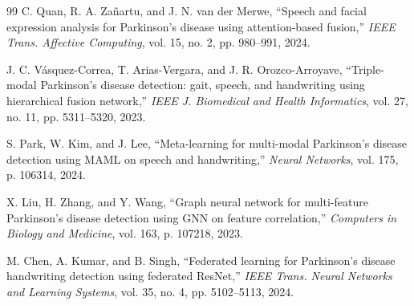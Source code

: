 \documentclass[10pt,conference,letterpaper]{IEEEtran}
\begin{document}
\begin{thebibliography}{99}
 C. Quan, R. A. Za\~{n}artu, and J. N. van der Merwe, ``Speech and facial expression analysis for {P}arkinson's disease using attention-based fusion,'' \textit{IEEE Trans. Affective Computing}, vol. 15, no. 2, pp. 980--991, 2024.

 J. C. V\'{a}squez-Correa, T. Arias-Vergara, and J. R. Orozco-Arroyave, ``Triple-modal {P}arkinson's disease detection: gait, speech, and handwriting using hierarchical fusion network,'' \textit{IEEE J. Biomedical and Health Informatics}, vol. 27, no. 11, pp. 5311--5320, 2023.

 S. Park, W. Kim, and J. Lee, ``Meta-learning for multi-modal {P}arkinson's disease detection using {MAML} on speech and handwriting,'' \textit{Neural Networks}, vol. 175, p. 106314, 2024.

 X. Liu, H. Zhang, and Y. Wang, ``Graph neural network for multi-feature {P}arkinson's disease detection using {GNN} on feature correlation,'' \textit{Computers in Biology and Medicine}, vol. 163, p. 107218, 2023.

 M. Chen, A. Kumar, and B. Singh, ``Federated learning for {P}arkinson's disease handwriting detection using federated {ResNet},'' \textit{IEEE Trans. Neural Networks and Learning Systems}, vol. 35, no. 4, pp. 5102--5113, 2024.

\end{thebibliography}
\end{document}
